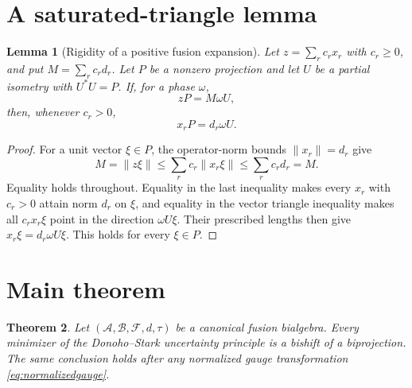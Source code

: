 \documentclass[11pt]{amsart}
\newtheorem{theorem}{Theorem}
\newtheorem{lemma}[theorem]{Lemma}
\newcommand{\A}{\mathcal A}
\newcommand{\B}{\mathcal B}
\newcommand{\F}{\mathcal F}
\begin{document}
\section*{A saturated-triangle lemma}

\begin{lemma}[Rigidity of a positive fusion expansion]\label{lem:rigidity}
Let $z=\sum_r c_rx_r$ with $c_r\geq0$, and put
$M=\sum_r c_rd_r$.  Let $P$ be a nonzero projection and let $U$ be a
partial isometry with $U^*U=P$.  If, for a phase $\omega$,
\[
 zP=M\omega U,
\]
then, whenever $c_r>0$,
\[
 x_rP=d_r\omega U.
\]
\end{lemma}

\begin{proof}
For a unit vector $\xi\in P$, the operator-norm bounds
$\|x_r\|=d_r$ give
\[
 M=\|z\xi\|
 \leq\sum_r c_r\|x_r\xi\|
 \leq\sum_r c_rd_r=M.
\]
Equality holds throughout.  Equality in the last inequality makes every
$x_r$ with $c_r>0$ attain norm $d_r$ on $\xi$, and equality in the vector
triangle inequality makes all $c_rx_r\xi$ point in the direction
$\omega U\xi$.  Their prescribed lengths then give
$x_r\xi=d_r\omega U\xi$.  This holds for every $\xi\in P$.
\end{proof}

\section*{Main theorem}

\begin{theorem}\label{thm:main}
Let $(\A,\B,\F,d,\tau)$ be a canonical fusion bialgebra.  Every minimizer of
the Donoho--Stark uncertainty principle is a bishift of a biprojection.
The same conclusion holds after any normalized gauge transformation
\eqref{eq:normalizedgauge}.
\end{theorem}
\end{document}
